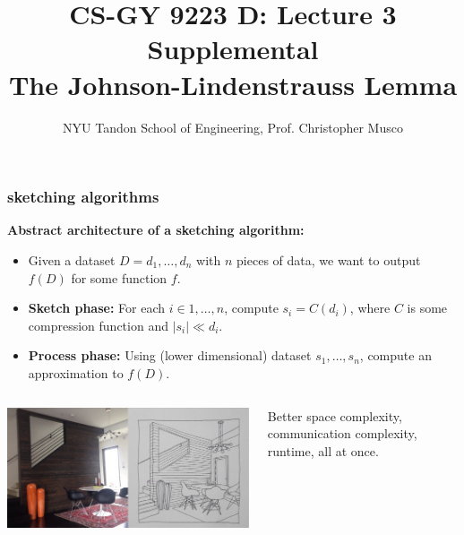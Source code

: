 \documentclass[compress,handout]{beamer}
\title{CS-GY 9223 D: Lecture 3 Supplemental \\ The Johnson-Lindenstrauss Lemma}
\author{NYU Tandon School of Engineering, Prof. Christopher Musco}
\date{}
\begin{document}
\begin{frame}
	\titlepage 
\end{frame}


\begin{frame}
	\frametitle{sketching algorithms}
	\textbf{Abstract architecture of a sketching algorithm:}
	\begin{itemize}
		\item Given a dataset $D = {d_1, \ldots, d_n}$ with $n$ pieces of data, we want to output $f(D)$ for some function $f$. 
		\item \textbf{Sketch phase:} For each $i \in 1, \ldots, n$, compute $s_i = C(d_i)$, where $C$ is some compression function and $|s_i| \ll d_i$.
		\item \textbf{Process phase:} Using (lower dimensional) dataset $s_1, \ldots, s_n$, compute an approximation to $f(D)$.
	\end{itemize}
	
	\vspace{.5em}
	\begin{columns}
		\begin{column}{.5\textwidth}
			\hspace{1em}\includegraphics[width=.9\textwidth]{sketch.jpg} 
		\end{column}
		\begin{column}{.5\textwidth}
		Better space complexity, communication complexity, runtime, all at once.
		\end{column}
	\end{columns}	
\end{frame}
\end{document}
